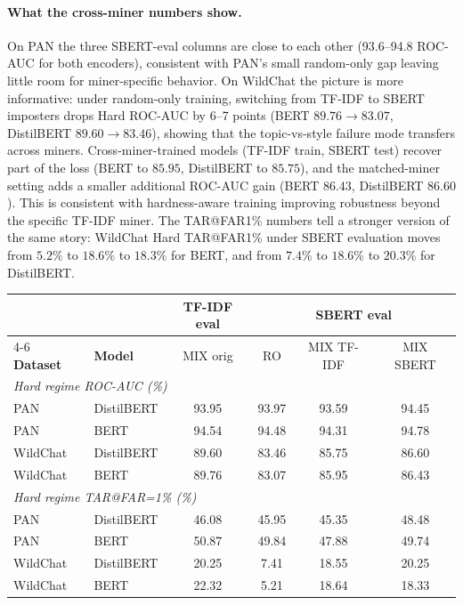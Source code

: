 \documentclass[11pt]{article}
\renewcommand{\arraystretch}{1.05}
\begin{document}
\paragraph{What the cross-miner numbers show.} On PAN the three SBERT-eval columns are close to each other (93.6--94.8 ROC-AUC for both encoders), consistent with PAN's small random-only gap leaving little room for miner-specific behavior. On WildChat the picture is more informative: under random-only training, switching from TF-IDF to SBERT imposters drops Hard ROC-AUC by 6--7 points (BERT $89.76 \to 83.07$, DistilBERT $89.60 \to 83.46$), showing that the topic-vs-style failure mode transfers across miners. Cross-miner-trained models (TF-IDF train, SBERT test) recover part of the loss (BERT to $85.95$, DistilBERT to $85.75$), and the matched-miner setting adds a smaller additional ROC-AUC gain (BERT $86.43$, DistilBERT $86.60$). This is consistent with hardness-aware training improving robustness beyond the specific TF-IDF miner. The TAR@FAR1\% numbers tell a stronger version of the same story: WildChat Hard TAR@FAR1\% under SBERT evaluation moves from $5.2\%$ to $18.6\%$ to $18.3\%$ for BERT, and from $7.4\%$ to $18.6\%$ to $20.3\%$ for DistilBERT.
\FloatBarrier
\begingroup
\renewcommand{\arraystretch}{0.78}
\setlength{\tabcolsep}{2pt}
\captionsetup{skip=1pt}
\vspace{-0.3em}
\begin{center}
\begin{minipage}{0.98\columnwidth}
\centering
\tiny
\begin{tabular}{l l c c c c}
\toprule
& & \textbf{TF-IDF eval} & \multicolumn{3}{c}{\textbf{SBERT eval}} \\
\cmidrule(lr){4-6}
\textbf{Dataset} & \textbf{Model} & MIX orig & RO & MIX TF-IDF & MIX SBERT \\
\midrule
\multicolumn{6}{l}{\textit{Hard regime ROC-AUC (\%)}} \\
PAN      & DistilBERT  & 93.95 & 93.97 & 93.59 & 94.45 \\
PAN      & BERT        & 94.54 & 94.48 & 94.31 & 94.78 \\
WildChat & DistilBERT  & 89.60 & 83.46 & 85.75 & 86.60 \\
WildChat & BERT        & 89.76 & 83.07 & 85.95 & 86.43 \\
\midrule
\multicolumn{6}{l}{\textit{Hard regime TAR@FAR=1\% (\%)}} \\
PAN      & DistilBERT  & 46.08 & 45.95 & 45.35 & 48.48 \\
PAN      & BERT        & 50.87 & 49.84 & 47.88 & 49.74 \\
WildChat & DistilBERT  & 20.25 & \phantom{0}7.41 & 18.55 & 20.25 \\
WildChat & BERT        & 22.32 & \phantom{0}5.21 & 18.64 & 18.33 \\
\bottomrule
\end{tabular}
\label{tab:app_sbert_summary}
\end{minipage}
\end{center}
\endgroup
\end{document}

